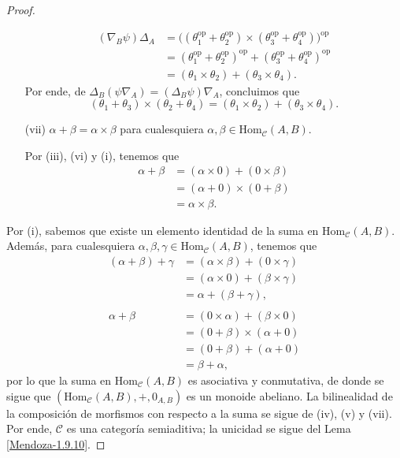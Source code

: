 \documentclass[tesis]{subfiles}
\begin{document}
\begin{proof}
\begin{itemize}
\begin{align*}
                (\nabla_B\psi)\Delta_A &= \big((\theta_1^{\text{op}}+\theta_2^{\text{op}})\times(\theta_3^{\text{op}}+\theta_4^{\text{op}})\big)^{\text{op}} \\
                                       &= (\theta_1^{\text{op}}+\theta_2^{\text{op}})^{\text{op}}+(\theta_3^{\text{op}}+\theta_4^{\text{op}})^{\text{op}} \\
                                       &= (\theta_1\times\theta_2)+(\theta_3\times\theta_4).
            \end{align*}
            Por ende, de $\Delta_B(\psi\nabla_A)=(\Delta_B\psi)\nabla_A$, concluimos que
            \[
                (\theta_1+\theta_3)\times(\theta_2+\theta_4) = (\theta_1\times\theta_2)+(\theta_3\times\theta_4).
            \] 
            
        \item[(vii)] $\alpha+\beta=\alpha\times\beta$ para cualesquiera $\alpha,\beta\in\text{Hom}_\mathscr{C}(A,B)$.

            Por (iii), (vi) y (i), tenemos que
            \begin{align*}
                \alpha+\beta &= (\alpha\times0)+(0\times\beta) \\
                             &= (\alpha+0)\times(0+\beta) \\
                             &= \alpha\times\beta.
            \end{align*}
    \end{itemize}

    Por (i), sabemos que existe un elemento identidad de la suma en $\text{Hom}_\mathscr{C}(A,B)$. Además, para cualesquiera $\alpha,\beta,\gamma\in\text{Hom}_\mathscr{C}(A,B)$, tenemos que
    \begin{align*}
        (\alpha+\beta)+\gamma &= (\alpha\times\beta)+(0\times\gamma) \tag{por (i), (vii) y (iii)} \\
                              &= (\alpha\times0)+(\beta\times\gamma) \tag{por (vi)} \\
                              &= \alpha+(\beta+\gamma), \tag{por (vii) y (iii)} \\ \\
        \alpha+\beta &= (0\times\alpha)+(\beta\times0) \tag{por (iii)} \\
                     &= (0+\beta)\times(\alpha+0) \tag{por (vi)} \\
                     &= (0+\beta)+(\alpha+0) \tag{por (vii)} \\
                     &= \beta+\alpha,
    \end{align*}
    por lo que la suma en $\text{Hom}_\mathscr{C}(A,B)$ es asociativa y conmutativa, de donde se sigue que $(\text{Hom}_\mathscr{C}(A,B),+,0_{A,B})$ es un monoide abeliano. La bilinealidad de la composición de morfismos con respecto a la suma se sigue de (iv), (v) y (vii). Por ende, $\mathscr{C}$ es una categoría semiaditiva; la unicidad se sigue del Lema \ref{Mendoza-1.9.10}.
\end{proof}
\end{document}
